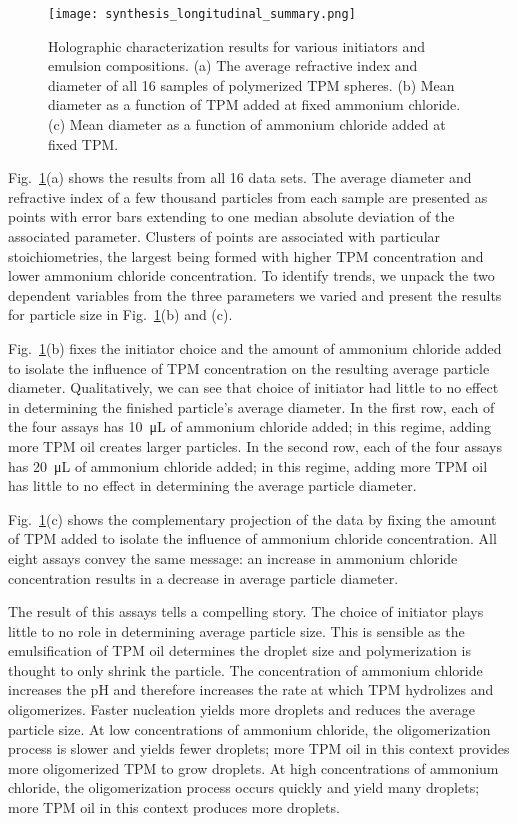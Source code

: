 \begin{figure}
    \centering
    \texttt{[image: synthesis\_longitudinal\_summary.png]}
    \caption{Holographic characterization results for various initiators and
      emulsion compositions. (a) The average refractive index and diameter of
      all \num{16} samples of polymerized TPM spheres.
     (b) Mean diameter as a function of TPM added at fixed ammonium chloride.
     (c) Mean diameter as a function of ammonium chloride added at fixed TPM.}
    \label{fig:longitudinal_summary}
\end{figure}

Fig.~\ref{fig:longitudinal_summary}(a) shows the results from all \num{16} data sets.
The average diameter and refractive index of a few thousand particles from each sample
are presented as points with error bars extending to one median absolute deviation
of the associated parameter. Clusters of points are associated with particular
stoichiometries, the largest being formed with higher TPM concentration
and lower ammonium chloride concentration.
To identify trends, we unpack the two dependent variables from the three
parameters we varied and present the  results for particle size in
Fig.~\ref{fig:longitudinal_summary}(b) and (c).

Fig.~\ref{fig:longitudinal_summary}(b) fixes the initiator choice and the
amount of ammonium chloride added to isolate the influence of TPM concentration
on the resulting average particle diameter. Qualitatively, we can see that
choice of initiator had little to no effect in determining the finished particle's
average diameter. In the first row, each of the four assays has \SI{10}{\micro\liter}
of ammonium chloride added; in this regime, adding more TPM oil
creates larger particles. In the second row, each of the four
assays has \SI{20}{\micro\liter} of ammonium chloride added; in this regime, adding
more TPM oil has little to no effect in determining the average particle diameter.

Fig.~\ref{fig:longitudinal_summary}(c) shows the complementary projection
of the data by fixing the amount of TPM added to isolate the influence of
ammonium chloride concentration. All eight assays convey the same message:
an increase in ammonium chloride concentration results in a decrease in
average particle diameter.

The result of this assays tells a compelling story. The choice of initiator plays little
to no role in determining average particle size. This is sensible as the emulsification
of TPM oil determines the droplet size and polymerization is thought to only
shrink the particle. The concentration of ammonium chloride increases the pH and
therefore increases the rate at which TPM hydrolizes and oligomerizes. Faster nucleation
yields more droplets and reduces the average particle size.
At low concentrations of ammonium chloride, the oligomerization process is slower
and yields fewer droplets; more TPM oil in this context provides more oligomerized
TPM to grow droplets. At high concentrations of ammonium chloride, the oligomerization
process occurs quickly and yield many droplets; more TPM oil in this context produces
more droplets.



